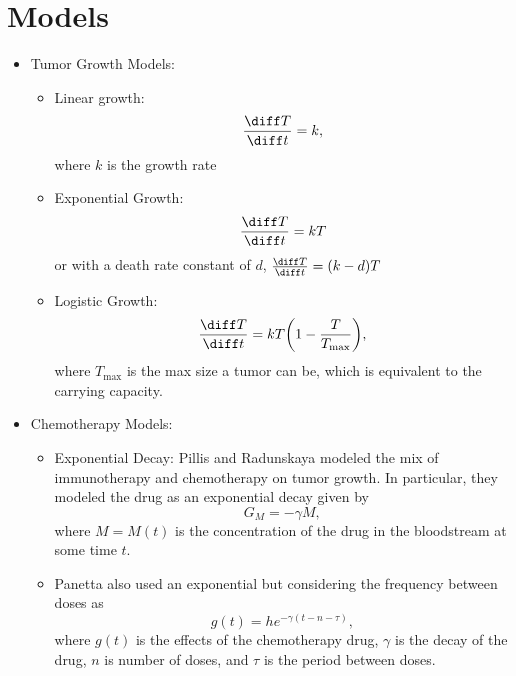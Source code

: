 \documentclass[11pt]{amsart}
\begin{document}
\section{Models}
\label{appendix: models}
\begin{itemize}

	\item Tumor Growth Models:
		\begin{itemize}
	\item Linear growth: 
		\begin{equation}
			\frac{\diff T}{\diff t} = k,
			\label{eq: lin}
		\end{equation} 
		where $k$ is the growth rate
	\item Exponential Growth:
		\begin{equation}
			\frac{\diff T}{\diff t} = kT \label{eq: exp}
		\end{equation} 
	 or with a death rate constant of $d$, $\frac{\diff T}{\diff t} = (k-d)T$
	\item Logistic Growth: 
		\begin{equation} 
			\frac{\diff T}{\diff t} = kT \biggl(1- \frac{T}{T_{\max}}\biggr)\label{eq: logistic},
		\end{equation}
		where $T_{\max}$ is the max size a tumor can be, which is equivalent to the carrying capacity.
		\end{itemize}
		
	\item Chemotherapy Models: 
		\begin{itemize}
			\item Exponential Decay: Pillis and Radunskaya modeled the mix of immunotherapy and chemotherapy on tumor growth. In particular, they modeled the drug as an exponential decay given by 
				\begin{equation}
					G_M = -\gamma M \label{eq: Pillis},
				\end{equation}
				where $M=M(t)$ is the concentration of the drug in the bloodstream at some time $t$.
				
			\item Panetta also used an exponential but considering the frequency between doses as
				\begin{equation}
					g(t) = h e^{-\gamma(t-n-\tau)} \label{eq:PanettaExpDec},
				\end{equation}
				where $g(t)$ is the effects of the chemotherapy drug, $\gamma$ is the decay of the drug, $n$ is number of doses, and $\tau$ is the period between doses.
				

\end{itemize}
\end{itemize}
\end{document}
